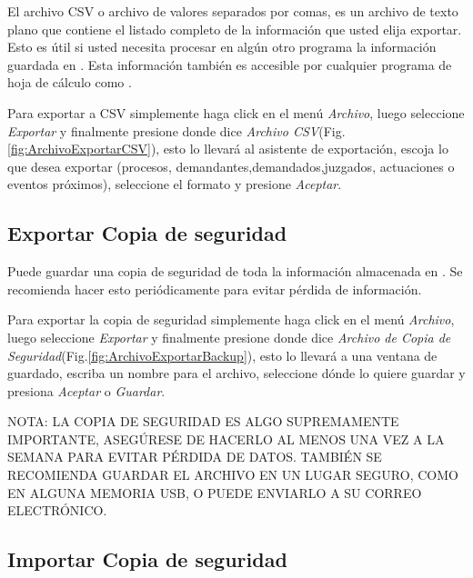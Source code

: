El archivo CSV o archivo de valores separados por comas, es un archivo de texto plano que contiene el listado completo de la informaci\'on que usted elija exportar. Esto es \'util si usted necesita procesar en alg\'un otro programa la informaci\'on guardada en \softwareAbogadosDesktop. Esta informaci\'on tambi\'en es accesible por cualquier programa de hoja de c\'alculo como \microsoft \excel.

Para exportar a CSV simplemente haga click en el men\'u \emph{Archivo}, luego seleccione \emph{Exportar} y finalmente presione donde dice \emph{Archivo CSV}(Fig.\ref{fig:ArchivoExportarCSV}), esto lo llevar\'a al asistente de exportaci\'on, escoja lo que desea exportar (procesos, demandantes,demandados,juzgados, actuaciones o eventos pr\'oximos), seleccione el formato y presione \emph{Aceptar}.
   

\subsection{Exportar Copia de seguridad}
\label{sec:exportarBackup}
Puede guardar una copia de seguridad de toda la informaci\'on almacenada en \softwareAbogadosDesktop. Se recomienda hacer esto peri\'odicamente para evitar p\'erdida de informaci\'on. 

Para exportar la copia de seguridad simplemente haga click en el men\'u \emph{Archivo}, luego seleccione \emph{Exportar} y finalmente presione donde dice \emph{Archivo de Copia de Seguridad}(Fig.\ref{fig:ArchivoExportarBackup}), esto lo llevar\'a a una ventana de guardado, escriba un nombre para el archivo, seleccione d\'onde lo quiere guardar y presiona \emph{Aceptar} o \emph{Guardar}.


NOTA: LA COPIA DE SEGURIDAD ES ALGO SUPREMAMENTE IMPORTANTE, ASEG\'URESE DE HACERLO AL MENOS UNA VEZ A LA SEMANA PARA EVITAR P\'ERDIDA DE DATOS. TAMBI\'EN SE RECOMIENDA GUARDAR EL ARCHIVO EN UN LUGAR SEGURO, COMO EN ALGUNA MEMORIA USB, O PUEDE ENVIARLO A SU CORREO ELECTR\'ONICO.

\subsection{Importar Copia de seguridad}

